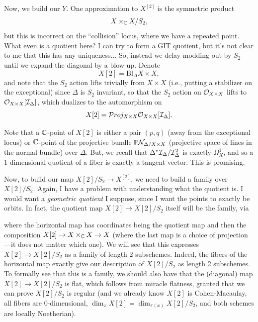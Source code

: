 \documentclass[12pt]{article}
\newcommand{\Bl}{\mathrm{Bl}}
\begin{document}
\begin{itemize}
    Now, we build our $Y$. One approximation to $X^{[2]}$ is the symmetric product
    \[X\times_{\mathbb{C}} X/S_2,\]
    but this is incorrect on the ``collision'' locus, where we have a repeated point. {\color{red} What even is a quotient here? I can try to form a GIT quotient, but it's not clear to me that this has any uniqueness...} So, instead we delay modding out by $S_2$ until we expand the diagonal by a blow-up. Denote
    \[X[2] = \Bl_\Delta X\times X,\]
    and note that the $S_2$ action lifts trivially from $X\times X$ (i.e., putting a stabilizer on the exceptional) since $\Delta$ is $S_2$ invariant, so that the $S_2$ action on $\mathcal{O}_{X\times X}$ lifts to $\mathcal{O}_{X\times X}[\mathcal{I}_\Delta]$, which dualizes to the automorphism on
    \[X[2] = \mathcal{P}\hspace{0mm}roj_{X\times X} \mathcal{O}_{X\times X}[\mathcal{I}_\Delta].\]

    Note that a $\mathbb{C}$-point of $X[2]$ is either a pair $(p,q)$ (away from the exceptional locus) or $\mathbb{C}$-point of the projective bundle $\mathbb{P} \mathcal{N}_{\Delta/X\times X}$ (projective space of lines in the normal bundle) over $\Delta$. But, we recall that $\Delta^* \mathcal{I}_\Delta/\mathcal{I}_\Delta^2$ is exactly $\Omega_X^1$, and so a 1-dimensional quotient of a fiber is exactly a tangent vector. This is promising.

    Now, to build our map $X[2]/S_2 \to X^{[2]}$, we need to build a family over $X[2]/S_2$. {\color{red} Again, I have a problem with understanding what the quotient is. I would want a \textit{geometric quotient} I suppose, since I want the points to exactly be orbits}. In fact, the quotient map $X[2]\to X[2]/S_2$ itself will be the family, via
    \begin{center}
    \end{center}
    where the horizontal map has coordinates being the quotient map and then the composition $X[2] \to X\times_{\mathbb{C}} X \to X$ (where the last map is a choice of projection---it does not matter which one). We will see that this expresses $X[2] \to X[2]/S_2$ as a family of length 2 subschemes. Indeed, the fibers of the horizontal map exactly give our description of $X[2]/S_2$ as length 2 subschemes. To formally see that this is a family, we should also have that the (diagonal) map $X[2]\to X[2]/S_2$ is flat, which follows from miracle flatness, granted that we can prove $X[2]/S_2$ is regular (and we already know $X[2]$ is Cohen-Macaulay, all fibers are 0-dimensional, $\dim_x X[2] = \dim_{\pi(x)} X[2]/S_2$, and both schemes are locally Noetherian).


\end{itemize}
\end{document}
